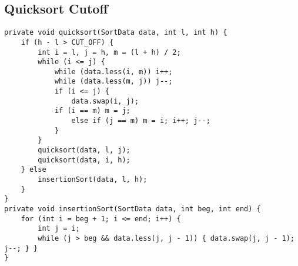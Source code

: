 \subsection*{Quicksort Cutoff}
\begin{verbatim}
private void quicksort(SortData data, int l, int h) { 
	if (h - l > CUT_OFF) {
		int i = l, j = h, m = (l + h) / 2; 
		while (i <= j) {
			while (data.less(i, m)) i++; 
			while (data.less(m, j)) j--; 
			if (i <= j) {
				data.swap(i, j);
			if (i == m) m = j;
				else if (j == m) m = i; i++; j--;
			}
		} 
		quicksort(data, l, j);
		quicksort(data, i, h);
	} else
		insertionSort(data, l, h);
	}
}
private void insertionSort(SortData data, int beg, int end) {
	for (int i = beg + 1; i <= end; i++) {
		int j = i;
		while (j > beg && data.less(j, j - 1)) { data.swap(j, j - 1); j--; } }
}
	
\end{verbatim}
\